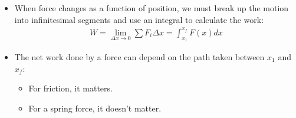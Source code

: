 \documentclass[aspectratio=169,
hyperref={colorlinks,urlcolor=blue}
]{beamer}
\begin{document}
{\begin{center}
\end{center}
}



{
\begin{itemize}
\item When force changes as a function of position, we must break up the motion into infinitesimal segments and use an integral to calculate the work:
\begin{align*}
W=\lim_{\Delta x \to 0}\sum F_i\Delta x=\int_{x_1}^{x_f}F(x) dx
\end{align*}
\item The net work done by a force can depend on the path taken between $x_1$ and $x_f$:
\begin{itemize}
\item For friction, it matters.
\item For a spring force, it doesn't matter.

\end{itemize}

\end{itemize}
}
\end{document}
